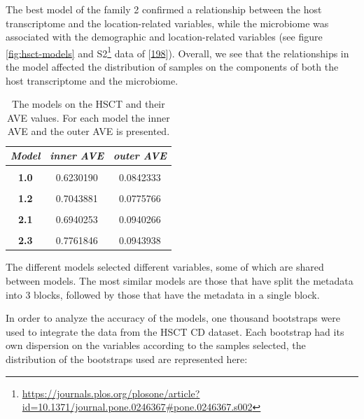 \documentclass[
  12pt,
  a4paper,
  twoside,
  openright]{book}
\DeclareRobustCommand{\href}[2]{#2\footnote{\url{#1}}}
\begin{document}
The best model of the family 2 confirmed a relationship between the host transcriptome and the location-related variables, while the microbiome was associated with the demographic and location-related variables (see figure \ref{fig:hsct-models} and \href{https://journals.plos.org/plosone/article?id=10.1371/journal.pone.0246367\#pone.0246367.s002}{S2} data of {[}\protect\hyperlink{ref-revilla2021}{198}{]}).
Overall, we see that the relationships in the model affected the distribution of samples on the components of both the host transcriptome and the microbiome.

\begin{table}[H]

\caption[The models on the HSCT and their AVE values.]{\label{tab:hsct-models-ave}The models on the HSCT and their AVE values. For each model the inner AVE and the outer AVE is presented.}
\centering
\begin{tabular}[t]{|>{}c|c|>{}c|}
\hline
\em{\textbf{Model}} & \em{\textbf{inner AVE}} & \em{\textbf{outer AVE}}\\
\hline
\textbf{\cellcolor{gray!6}{0.0}} & \cellcolor{gray!6}{0.3999234} & \cellcolor{gray!6}{0.1001689}\\
\hline
\textbf{1.0} & 0.6230190 & 0.0842333\\
\hline
\textbf{\cellcolor{gray!6}{1.1}} & \cellcolor{gray!6}{0.5678189} & \cellcolor{gray!6}{0.0848714}\\
\hline
\textbf{1.2} & 0.7043881 & 0.0775766\\
\hline
\textbf{\cellcolor{gray!6}{2.0}} & \cellcolor{gray!6}{0.2517363} & \cellcolor{gray!6}{0.0982050}\\
\hline
\textbf{2.1} & 0.6940253 & 0.0940266\\
\hline
\textbf{\cellcolor{gray!6}{2.2}} & \cellcolor{gray!6}{0.8187640} & \cellcolor{gray!6}{0.0941628}\\
\hline
\textbf{2.3} & 0.7761846 & 0.0943938\\
\hline
\end{tabular}
\end{table}

The different models selected different variables, some of which are shared between models.
The most similar models are those that have split the metadata into 3 blocks, followed by those that have the metadata in a single block.

In order to analyze the accuracy of the models, one thousand bootstraps were used to integrate the data from the HSCT CD dataset.
Each bootstrap had its own dispersion on the variables according to the samples selected, the distribution of the bootstraps used are represented here:
\end{document}
